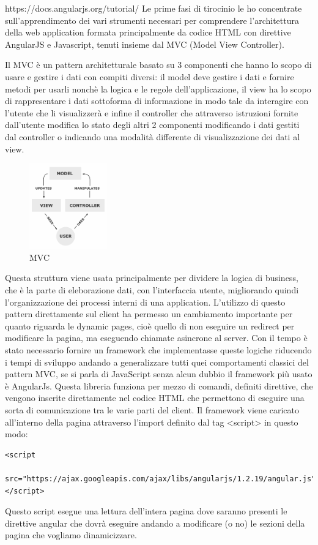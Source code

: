 https://docs.angularjs.org/tutorial/
\fi
Le prime fasi di tirocinio le ho concentrate sull'apprendimento dei vari strumenti necessari per comprendere l'architettura della web application formata principalmente da codice HTML con direttive AngularJS e Javascript, tenuti insieme dal MVC (Model View Controller).

Il MVC è un pattern architetturale basato su 3 componenti che hanno lo scopo di usare e gestire i dati con compiti diversi: il model deve gestire i dati e fornire metodi per usarli nonchè la logica e le regole dell'applicazione, il view ha lo scopo di rappresentare i dati sottoforma di informazione in modo tale da interagire con l'utente che li visualizzerà e infine il controller che attraverso istruzioni fornite dall'utente modifica lo stato degli altri 2 componenti modificando i dati gestiti dal controller o indicando una modalità differente di visualizzazione dei dati al view.
\begin{figure}[H]
 \centering
  \includegraphics[width=0.3\textwidth]{img/MVC-Process.png}
 \caption{MVC}
 \end{figure}
Questa struttura viene usata principalmente per dividere la logica di business, che è la parte di eleborazione dati, con l'interfaccia utente, migliorando quindi l'organizzazione dei processi interni di una application.
L'utilizzo di questo pattern direttamente sul client ha permesso un cambiamento importante per quanto riguarda le dynamic pages, cioè quello di non eseguire un redirect per modificare la pagina, ma eseguendo chiamate asincrone al server.
Con il tempo è stato necessario fornire un framework che implementasse queste logiche riducendo i tempi di sviluppo andando a generalizzare tutti quei comportamenti classici del pattern MVC, se si parla di JavaScript senza alcun dubbio il framework più usato è AngularJs.
Questa libreria funziona per mezzo di comandi, definiti direttive, che vengono inserite direttamente nel codice HTML che permettono di eseguire una sorta di comunicazione tra le varie parti del client. Il framework viene caricato all'interno della pagina attraverso l'import definito dal tag <script> in questo modo:
\begin{lstlisting}[language=betterHtml]
<script
 src="https://ajax.googleapis.com/ajax/libs/angularjs/1.2.19/angular.js">
</script>
\end{lstlisting}
Questo script esegue una lettura dell'intera pagina dove saranno presenti le direttive angular che dovrà eseguire andando a modificare (o no) le sezioni della pagina che vogliamo dinamicizzare.


